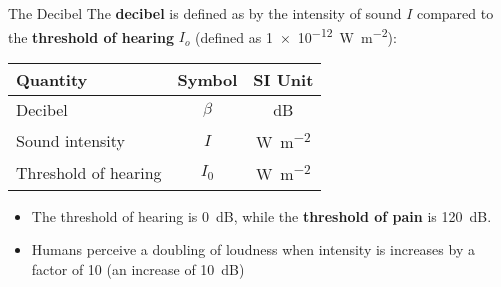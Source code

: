 \documentclass[12pt,aspectratio=169]{beamer}
\newcommand{\eq}[2]{\vspace{#1}{\Large\begin{displaymath}#2\end{displaymath}}}
\begin{document}
\begin{frame}{The Decibel}
  The \textbf{decibel} is defined as by the intensity of sound $I$ compared to
  the \textbf{threshold of hearing} $I_o$ (defined as
  \SI{1e-12}{\watt\per\metre^2}):
  
  \eq{-.2in}{
    \boxed{\beta=10\log_{10}\left[\frac{I}{I_0}\right]}
  }
  \begin{center}
    \begin{tabular}{l|c|c}
      \rowcolor{pink}
      \textbf{Quantity} & \textbf{Symbol} & \textbf{SI Unit} \\ \hline
      Decibel              & $\beta$ & \si{dB}\\
      Sound intensity      & $I$     & \si{\watt\per\metre^2}\\
      Threshold of hearing & $I_0$   &  \si{\watt\per\metre^2}
    \end{tabular}
  \end{center}  
  
  \begin{itemize}
  \item The threshold of hearing is \SI{0}{dB}, while the
    \textbf{threshold of pain} is \SI{120}{dB}.
  \item Humans perceive a doubling of loudness when intensity is increases by a
    factor of \num{10} (an increase of \SI{10}{dB})
  \end{itemize}
\end{frame}
\end{document}
